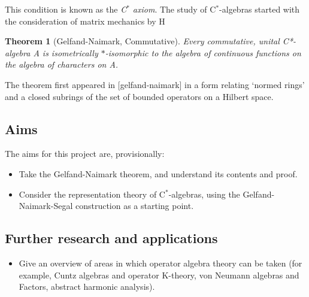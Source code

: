 \documentclass[12pt,a4paper]{amsart}
\theoremstyle{plain}
\newtheorem*{thm*}{Theorem}
\theoremstyle{definition}
\begin{document}
This condition is known as the \emph{C$^\ast$ axiom}. The study of C$^\ast$-algebras started with the consideration of matrix mechanics by H


\begin{thm*}[Gelfand-Naimark, Commutative]
	Every commutative, unital C*-algebra A is isometrically $\ast$-isomorphic to the algebra of continuous functions on the algebra of characters on A.

\end{thm*}
The theorem first appeared in [gelfand-naimark] in a form relating `normed rings' and a closed subrings of the set of bounded operators on a Hilbert space.


\subsection{Aims}
The aims for this project are, provisionally:
\begin{itemize}
	\item Take the Gelfand-Naimark theorem, and understand its contents and proof.
	\item Consider the representation theory of C$^\ast$-algebras, using the Gelfand-Naimark-Segal construction as a starting point.
\end{itemize}

\subsection{Further research and applications}
\begin{itemize}
	\item Give an overview of areas in which operator algebra theory can be taken (for example, Cuntz algebras and operator K-theory, von Neumann algebras and Factors, abstract harmonic analysis).
\end{itemize}
\end{document}
